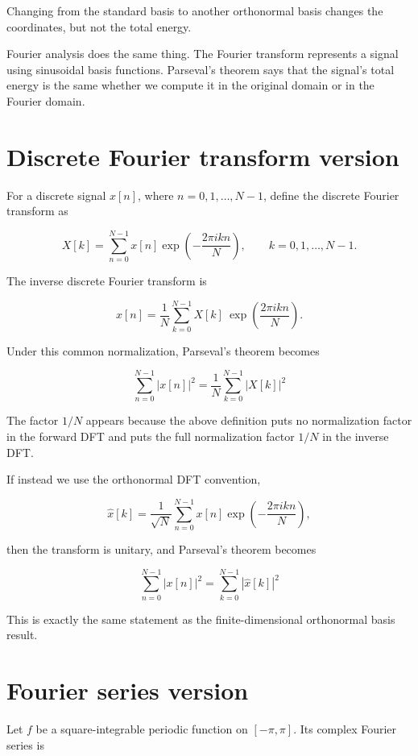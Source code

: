 Changing from the standard basis to another orthonormal basis changes the coordinates, but not the total energy.

Fourier analysis does the same thing. The Fourier transform represents a signal using sinusoidal basis functions. Parseval’s theorem says that the signal’s total energy is the same whether we compute it in the original domain or in the Fourier domain.

\section{Discrete Fourier transform version}

For a discrete signal \(x[n]\), where \(n=0,1,\dots,N-1\), define the discrete Fourier transform as

\[
X[k]=

\sum_{n=0}^{N-1}
x[n]
\exp\left(
-\frac{2\pi i kn}{N}
\right),
\qquad
k=0,1,\dots,N-1.
\]

The inverse discrete Fourier transform is

\[
x[n]=

\frac{1}{N}
\sum_{k=0}^{N-1}
X[k]\
\exp\left(
\frac{2\pi i kn}{N}
\right).
\]

Under this common normalization, Parseval’s theorem becomes

\[
\boxed{
\sum_{n=0}^{N-1}
|x[n]|^2
=
\frac{1}{N}
\sum_{k=0}^{N-1}
|X[k]|^2
}
\]

The factor \(1/N\) appears because the above definition puts no normalization factor in the forward DFT and puts the full normalization factor \(1/N\) in the inverse DFT.

If instead we use the orthonormal DFT convention,

\[
\widehat{x}[k]
=
\frac{1}{\sqrt{N}}
\sum_{n=0}^{N-1}
x[n]
\exp\left(
-\frac{2\pi i kn}{N}
\right),
\]

then the transform is unitary, and Parseval’s theorem becomes

\[
\boxed{
\sum_{n=0}^{N-1}
|x[n]|^2
=
\sum_{k=0}^{N-1}
|\widehat{x}[k]|^2
}
\]

This is exactly the same statement as the finite-dimensional orthonormal basis result.

\section{Fourier series version}

Let \(f\) be a square-integrable periodic function on \([-\pi,\pi]\). Its complex Fourier series is

